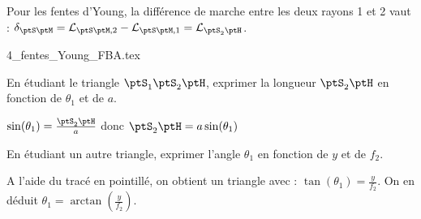 Pour les fentes d'Young, la différence de marche entre les deux rayons 1 et 2 vaut : $\delta_{\ptS \ptM}=\mathcal{L}_{\ptS \ptM,2}-\mathcal{L}_{\ptS \ptM,1}=\mathcal{L}_{\ptS_2 \ptH}$.

\initialisationPartieDroite %
\begin{center}
	{4_fentes_Young_FBA.tex}
\end{center}
                               \finalisationDuPartageDePage %

\debutEntrainement


\begin{enonce}
	En étudiant le triangle $\ptS_1 \ptS_2 \ptH$, exprimer la longueur $\ptS_2 \ptH$ en fonction de $\theta_1$ et de $a$.
\end{enonce}


\begin{corrige}
	$\sin(\theta_1)=\frac{\ptS_2 \ptH}{a}$ donc $\ptS_2 \ptH = a \sin(\theta_1)$
\end{corrige}


\begin{enonce}
	En étudiant un autre triangle, exprimer l'angle $\theta_1$ en fonction de $y$ et de $f_2$.
\end{enonce}


\begin{corrige}
	A l'aide du tracé en pointillé, on obtient un triangle avec : $\tan(\theta_1)=\frac{y}{f_2}$. On en déduit $\theta_1=\arctan(\frac{y}{f_2})$.
\end{corrige}

